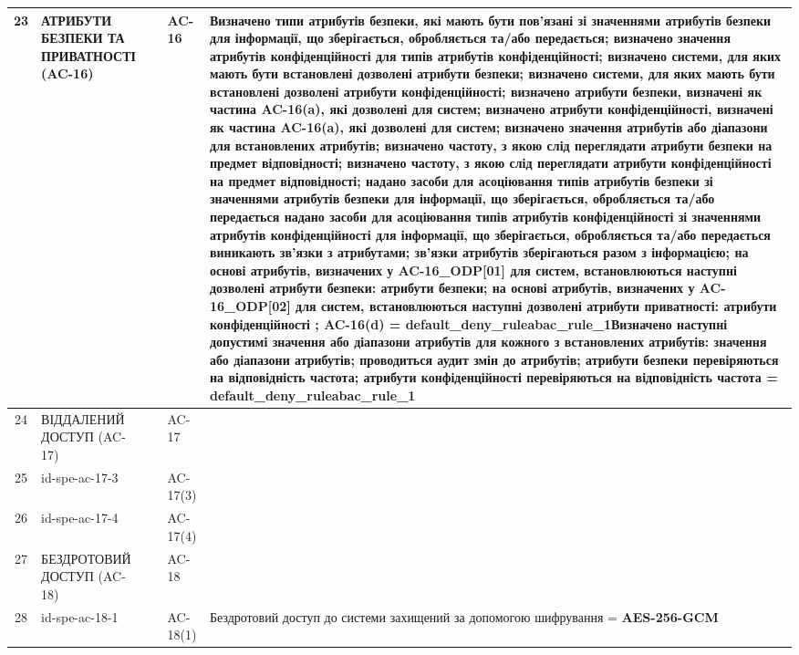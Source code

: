 \documentclass[10pt]{article}
\begin{document}
\begin{longtable}{|c|>{\raggedright\arraybackslash}p{2.5cm}|>{\raggedright\arraybackslash}p{4.5cm}|>{\raggedright\arraybackslash}p{3cm}|>{\raggedright\arraybackslash}p{4.5cm}|}
23 & АТРИБУТИ БЕЗПЕКИ ТА ПРИВАТНОСТІ (AC-16) &  & AC-16 & Визначено типи атрибутів безпеки, які мають бути пов'язані зі значеннями атрибутів безпеки для інформації, що зберігається, обробляється та/або передається; визначено значення атрибутів конфіденційності для типів атрибутів конфіденційності; визначено системи, для яких мають бути встановлені дозволені атрибути безпеки; визначено системи, для яких мають бути встановлені дозволені атрибути конфіденційності; визначено атрибути безпеки, визначені як частина AC-16(a), які дозволені для систем; визначено атрибути конфіденційності, визначені як частина AC-16(a), які дозволені для систем; визначено значення атрибутів або діапазони для встановлених атрибутів; визначено частоту, з якою слід переглядати атрибути безпеки на предмет відповідності; визначено частоту, з якою слід переглядати атрибути конфіденційності на предмет відповідності; надано засоби для асоціювання типів атрибутів безпеки зі значеннями атрибутів безпеки для інформації, що зберігається, обробляється та/або передається надано засоби для асоціювання типів атрибутів конфіденційності зі значеннями атрибутів конфіденційності для інформації, що зберігається, обробляється та/або передається виникають зв'язки з атрибутами; зв'язки атрибутів зберігаються разом з інформацією; на основі атрибутів, визначених у AC-16\_\allowbreak{}ODP[01] для систем, встановлюються наступні дозволені атрибути безпеки: атрибути безпеки; на основі атрибутів, визначених у AC-16\_\allowbreak{}ODP[02] для систем, встановлюються наступні дозволені атрибути приватності: атрибути конфіденційності ; AC-16(d) = \textbf{default\_\allowbreak{}deny\_\allowbreak{}ruleabac\_\allowbreak{}rule\_\allowbreak{}1}\newline Визначено наступні допустимі значення або діапазони атрибутів для кожного з встановлених атрибутів: значення або діапазони атрибутів; проводиться аудит змін до атрибутів; атрибути безпеки перевіряються на відповідність частота; атрибути конфіденційності перевіряються на відповідність частота = \textbf{default\_\allowbreak{}deny\_\allowbreak{}ruleabac\_\allowbreak{}rule\_\allowbreak{}1} \\ \hline
24 & ВІДДАЛЕНИЙ ДОСТУП (AC-17) &  & AC-17 &  \\ \hline
25 & id-spe-ac-17-3 &  & AC-17(3) &  \\ \hline
26 & id-spe-ac-17-4 &  & AC-17(4) &  \\ \hline
27 & БЕЗДРОТОВИЙ ДОСТУП (AC-18) &  & AC-18 &  \\ \hline
28 & id-spe-ac-18-1 &  & AC-18(1) & Бездротовий доступ до системи захищений за допомогою шифрування = \textbf{AES-256-GCM} \\ \hline

\end{longtable}
\end{document}
